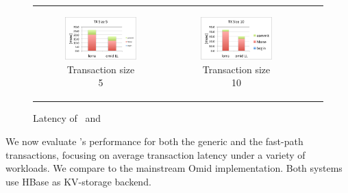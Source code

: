 \begin{figure}[]
\begin{tabular}{cccc}
    \begin{subfigure}[t]{0.4\textwidth}
	\includegraphics[width=\textwidth]{figs/lorravslltx5.pdf}
    \caption[]{Transaction size 5}
    \label{fig:latency:read}
    \label{fig:latency:lorra5}
  \end{subfigure} &

  \begin{subfigure}[t]{0.4\textwidth}
	\includegraphics[width=\textwidth]{figs/lorravslltx10.pdf}
    \caption[]{Transaction size 10}
    \label{fig:latency:lorra10}
  \end{subfigure} \\
  
    
  \end{tabular}
  \caption{Latency of \sys\ and \sysll\ }
\end{figure}

We now evaluate {\sys}'s performance for both the generic and the fast-path transactions, 
focusing on average transaction latency under a variety of workloads. We compare {\sys\/} 
to the mainstream Omid implementation. Both systems use HBase as KV-storage backend.

